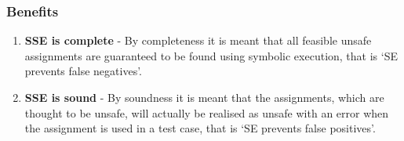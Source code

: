 \documentclass[11pt]{llncs}
\begin{document}
		
		\subsubsection{Benefits}
			\begin{enumerate}
				\item \textbf{SSE is complete}
					- By completeness it is meant that all feasible unsafe assignments are guaranteed to be found using symbolic execution, that is ‘SE prevents false negatives’\cite{2_Survey_SE}.

				\vspace{1mm}

				\item \textbf{SSE is sound}
					- By soundness it is meant that the assignments, which are thought to be unsafe, will actually be realised as unsafe with an error when the assignment is used in a test case, that is ‘SE prevents false positives’. \cite{2_Survey_SE}
			\end{enumerate}
			
			
\end{document}
